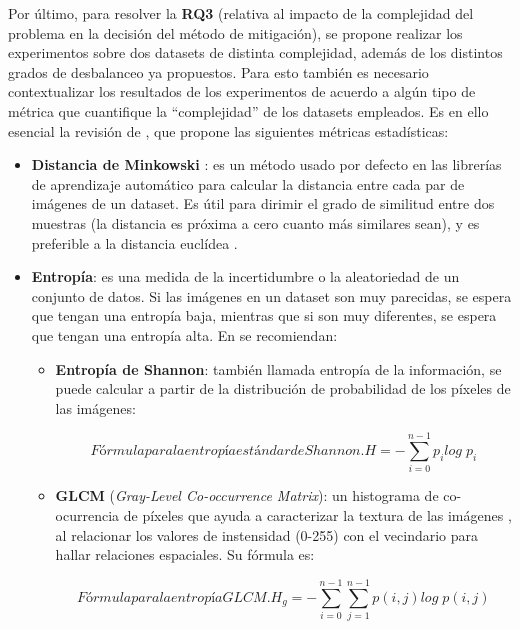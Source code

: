 Por último, para resolver la \textbf{RQ3} (relativa al impacto de la complejidad del problema en la decisión del método de mitigación), se propone realizar los experimentos sobre dos datasets de distinta complejidad, además de los distintos grados de desbalanceo ya propuestos. Para esto también es necesario contextualizar los resultados de los experimentos de acuerdo a algún tipo de métrica que cuantifique la ``complejidad'' de los datasets empleados. Es en ello esencial la revisión de \citet{rahane2020measures}, que propone las siguientes métricas estadísticas:

\begin{itemize}
    \fontsize{11pt}{12pt}\selectfont
    \item \textbf{Distancia de Minkowski} \cite{tensorflow2015-whitepaper}: es un método usado por defecto en las librerías de aprendizaje automático para calcular la distancia entre cada par de imágenes de un dataset. Es útil para dirimir el grado de similitud entre dos muestras (la distancia es próxima a cero cuanto más similares sean), y es preferible a la distancia euclídea \cite{rahane2020measures}.
    
    \item \textbf{Entropía}: es una medida de la incertidumbre o la aleatoriedad de un conjunto de datos. Si las imágenes en un dataset son muy parecidas, se espera que tengan una entropía baja, mientras que si son muy diferentes, se espera que tengan una entropía alta. En \citet{rahane2020measures} se recomiendan:

    \begin{itemize}
        \fontsize{11pt}{12pt}\selectfont
        \item \textbf{Entropía de Shannon}: también llamada entropía de la información, se puede calcular a partir de la distribución de probabilidad de los píxeles de las imágenes:

        \begin{equation}[EQ:SHANNON]{Fórmula para la entropía estándar de Shannon.}
            H = -\sum_{i=0}^{n-1}{p_i log \; p_i}
        \end{equation}

        \item \textbf{GLCM} (\textit{Gray-Level Co-occurrence Matrix}): un histograma de co-ocurrencia de píxeles que ayuda a caracterizar la textura de las imágenes \cite{rahane2020measures}, al relacionar los valores de instensidad (0-255) con el vecindario para hallar relaciones espaciales. Su fórmula es:

        \begin{equation}[EQ:GLCM]{Fórmula para la entropía GLCM.}
            H_g = -\sum_{i=0}^{n-1}{\sum_{j=1}^{n-1}{p(i,j) log \; p(i,j)}}
        \end{equation}
        
    \end{itemize}
\end{itemize}
\fi